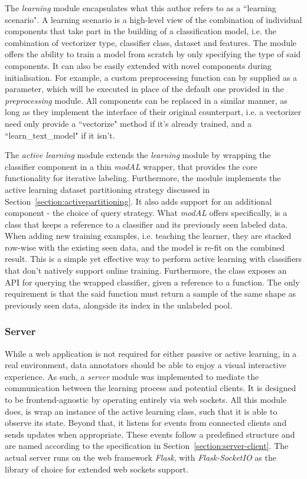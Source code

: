 \documentclass[a4paper,12pt]{article}
\begin{document}
The \emph{learning} module encapsulates what this author refers to as a ``learning scenario". A learning scenario is a high-level view of the combination of individual components that take part in the building of a classification model, i.e. the combination of vectorizer type, classifier class, dataset and features. The module offers the ability to train a model from scratch by only specifying the type of said components. It can also be easily extended with novel components during initialisation. For example, a custom preprocessing function can by supplied as a parameter, which will be executed in place of the default one provided in the \emph{preprocessing} module. All components can be replaced in a similar manner, as long as they implement the interface of their original counterpart, i.e. a vectorizer need only provide a ``vectorize" method if it's already trained, and a ``learn\_text\_model" if it isn't.

The \emph{active learning} module extends the \emph{learning} module by wrapping the classifier component in a thin \emph{modAL} \cite{modAL2018} wrapper, that provides the core functionality for iterative labeling. Furthermore, the module implements the active learning dataset partitioning strategy discussed in Section~\ref{section:activepartitioning}. It also adds support for an additional component - the choice of query strategy. What \emph{modAL} offers specifically, is a class that keeps a reference to a classifier and its previously seen labeled data. When adding new training examples, i.e. teaching the learner, they are stacked row-wise with the existing seen data, and the model is re-fit on the combined result. This is a simple yet effective way to perform active learning with classifiers that don't natively support online training. Furthermore, the class exposes an API for querying the wrapped classifier, given a reference to a function. The only requirement is that the said function must return a sample of the same shape as previously seen data, alongside its index in the unlabeled pool.
\subsubsection{Server}
While a web application is not required for either passive or active learning, in a real environment, data annotators should be able to enjoy a visual interactive experience. As such, a \emph{server} module was implemented to mediate the communication between the learning process and potential clients. It is designed to be frontend-agnostic by operating entirely via web sockets. All this module does, is wrap an instance of the active learning class, such that it is able to observe its state. Beyond that, it listens for events from connected clients and sends updates when appropriate. These events follow a predefined structure and are named according to the specification in Section~\ref{section:server-client}. The actual server runs on the web framework \emph{Flask}, with \emph{Flask-SocketIO} as the library of choice for extended web sockets support.
\end{document}
